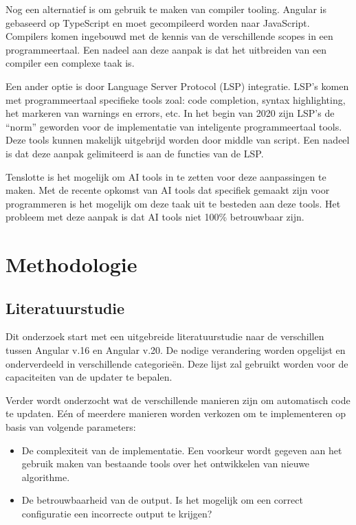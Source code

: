 Nog een alternatief is om gebruik te maken van compiler tooling.
Angular is gebaseerd op TypeScript en moet gecompileerd worden naar JavaScript.
Compilers komen ingebouwd met de kennis van de verschillende scopes in een programmeertaal.
Een nadeel aan deze aanpak is dat het uitbreiden van een compiler een complexe taak is.

Een ander optie is door Language Server Protocol (LSP) integratie.
LSP's komen met programmeertaal specifieke tools zoal: code completion, syntax highlighting, het markeren van warnings en errors, etc.
In het begin van 2020 zijn LSP's de ``norm'' geworden voor de implementatie van inteligente programmeertaal tools.
Deze tools kunnen makelijk uitgebrijd worden door middle van script.
Een nadeel is dat deze aanpak gelimiteerd is aan de functies van de LSP.

Tenslotte is het mogelijk om AI tools in te zetten voor deze aanpassingen te maken.
Met de recente opkomst van AI tools dat specifiek gemaakt zijn voor programmeren is het mogelijk om deze taak uit te besteden aan deze tools.
Het probleem met deze aanpak is dat AI tools niet 100\% betrouwbaar zijn.

\section{Methodologie}
\label{sec:methodologie}

\subsection{Literatuurstudie}
\label{sec:methodologie:literatuurstudie}

Dit onderzoek start met een uitgebreide literatuurstudie naar de verschillen tussen Angular v.16 en Angular v.20.
De nodige verandering worden opgelijst en onderverdeeld in verschillende categorieën.
Deze lijst zal gebruikt worden voor de capaciteiten van de updater te bepalen.

Verder wordt onderzocht wat de verschillende manieren zijn om automatisch code te updaten.
Eén of meerdere manieren worden verkozen om te implementeren op basis van volgende parameters:
\begin{itemize}
  \item De complexiteit van de implementatie. Een voorkeur wordt gegeven aan het gebruik maken van bestaande tools over het ontwikkelen van nieuwe algorithme.
  \item De betrouwbaarheid van de output. Is het mogelijk om een correct configuratie een incorrecte output te krijgen?
\end{itemize}

